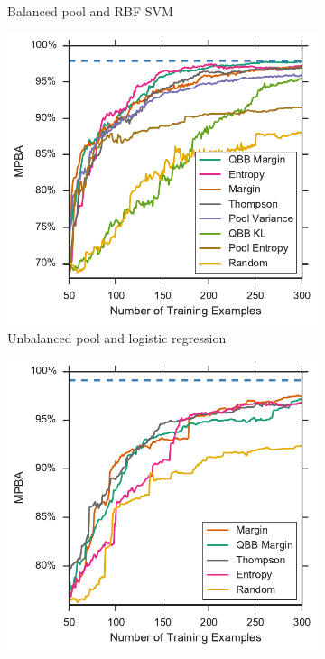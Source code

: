 \begin{figure}[p]
\begin{subfigure}{.5\textwidth}
		\caption{Balanced pool and RBF SVM}
		\label{fig:vstatlas_br_ind_upper}
	\end{subfigure}
	\begin{subfigure}{.5\textwidth}
		\centering
		\includegraphics[width=\textwidth]{figures/5_active/vstatlas_ul_ind_upper}
		\caption{Unbalanced pool and logistic regression}
		\label{fig:vstatlas_ul_ind_upper}
	\end{subfigure}%
	\begin{subfigure}{.5\textwidth}
		\centering
		\includegraphics[width=\linewidth]{figures/5_active/vstatlas_ur_ind_upper}

\end{subfigure}
\end{figure}
